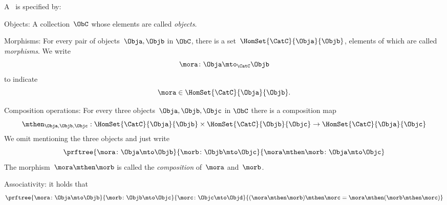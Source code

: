 \begin{ctdefinition}[Semicategory]
  \label{def:semicategory-compact}
  A \emph{}~\CatC is specified by:
\begin{body}
    \constit
  \begin{compactenum}
    \item Objects: A collection\footnotemark~$\ObC$ whose elements are called \emph{objects}.
    \item Morphisms: For every pair of objects~$\Obja,\Objb$ in $\ObC$, there is a set~$\HomSet{\CatC}{\Obja}{\Objb}$, elements of which are called \emph{morphisms}. We write
    \begin{equation}
    \mora \colon \Obja \mto_\CatC \Objb
    \end{equation}
    to indicate
    \begin{equation}
      \mora \in \HomSet{\CatC}{\Obja}{\Objb}.
      \end{equation}
    \item Composition operations: For every three objects~$\Obja,\Objb,\Objc$ in $\ObC$ there is a composition map
    \begin{equation}
        \mthen_{\Obja,\Objb,\Objc}: \HomSet{\CatC}{\Obja}{\Objb} \times \HomSet{\CatC}{\Objb}{\Objc}\to \HomSet{\CatC}{\Obja}{\Objc}
    \end{equation}
    We omit mentioning the three objects and just write
    \begin{equation}
        \prftree{\mora \colon \Obja \mto \Objb}{\morb\colon \Objb \mto \Objc}{\mora \mthen \morb \colon \Obja \mto \Objc}
    \end{equation}
    The morphism~$\mora \mthen \morb$ is called the \emph{composition} of~$\mora$ and~$\morb$.
  \end{compactenum}
 \condit
  \begin{compactenum}
    \item Associativity:  it holds that
    \begin{equation}
      \prftree{\mora\colon \Obja \mto \Objb}{\morb\colon \Objb \mto \Objc}{\morc\colon \Objc \mto \Objd}
      {
    (\mora\mthen \morb)
      \mthen \morc= \mora \mthen (\morb \mthen \morc)
      }
    \end{equation}
  \end{compactenum}
  \end{body}
\end{ctdefinition}

